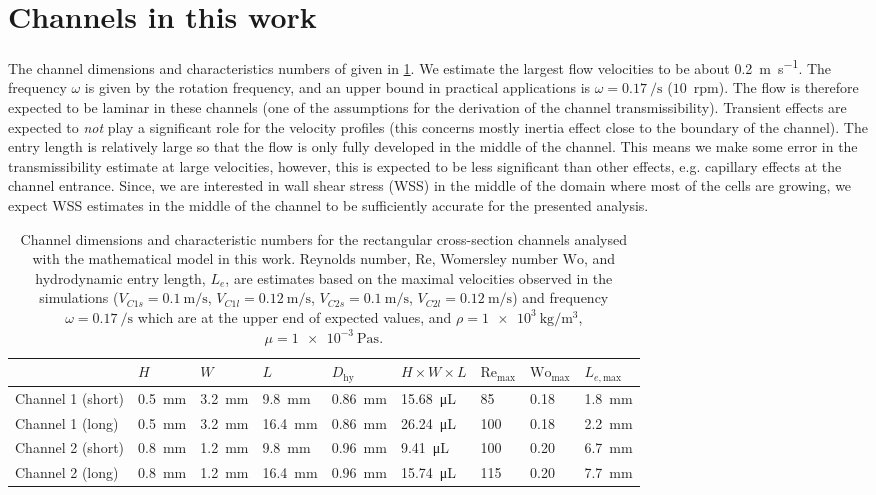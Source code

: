 \documentclass{article}
\begin{document}
\section{Channels in this work}
The channel dimensions and characteristics numbers of given in \cref{tab:val}. We estimate the largest flow velocities to be about \SI{0.2}{\m\per\s}. The frequency $\omega$ is given by the rotation frequency, and an upper bound in practical applications is $\omega = \SI{0.17}{\per\s}$ ($10$~rpm). The flow is therefore expected to be laminar in these channels (one of the assumptions for the derivation of the channel transmissibility). Transient effects are expected to \emph{not} play a significant role for the velocity profiles (this concerns mostly inertia effect close to the boundary of the channel). The entry length is relatively large so that the flow is only fully developed in the middle of the channel. This means we make some error in the transmissibility estimate at large velocities, however, this is expected to be less significant than other effects, e.g. capillary effects at the channel entrance. Since, we are interested in wall shear stress (WSS) in the middle of the domain where most of the cells are growing, we expect WSS estimates in the middle of the channel to be sufficiently accurate for the presented analysis.
\begin{table}[!htb]
\caption{Channel dimensions and characteristic numbers for the rectangular cross-section channels analysed with the mathematical model in this work. Reynolds number, $\text{Re}$, Womersley number $\text{Wo}$, and hydrodynamic entry length, $L_e$, are estimates based on the maximal velocities observed in the simulations ($V_{C1s} = \SI{0.1}{\m\per\s}$, $V_{C1l} = \SI{0.12}{\m\per\s}$, $V_{C2s} = \SI{0.1}{\m\per\s}$, $V_{C2l} = \SI{0.12}{\m\per\s}$) and frequency $\omega = \SI{0.17}{\per\s}$ which are at the upper end of expected values, and $\rho = \SI{1e3}{\kg\per\cubic\m}$, $\mu = \SI{1e-3}{\pascal\s}$.}
\centering
\begin{tabular}{lllllllll}
\toprule
                             & $H$ & $W$ & $L$ & $D_\text{hy}$ & $H\times W\times L$ & $\text{Re}_\text{max}$  & $\text{Wo}_\text{max}$ & $L_{e,\text{max}}$ \\\midrule
    Channel 1 (short) & \SI{0.5}{\milli\m} & \SI{3.2}{\milli\m} & \SI{9.8}{\milli\m}  & \SI{0.86}{\milli\m} & \SI{15.68}{\micro\liter} & 85 & 0.18 & \SI{1.8}{\milli\m} \\
    Channel 1 (long) & \SI{0.5}{\milli\m} & \SI{3.2}{\milli\m} & \SI{16.4}{\milli\m} & \SI{0.86}{\milli\m} & \SI{26.24}{\micro\liter} & 100 & 0.18 & \SI{2.2}{\milli\m}\\\midrule
    Channel 2 (short) & \SI{0.8}{\milli\m} & \SI{1.2}{\milli\m} & \SI{9.8}{\milli\m} & \SI{0.96}{\milli\m} & \SI{9.41}{\micro\liter} & 100 & 0.20 & \SI{6.7}{\milli\m}\\
    Channel 2 (long) & \SI{0.8}{\milli\m} & \SI{1.2}{\milli\m} & \SI{16.4}{\milli\m} & \SI{0.96}{\milli\m} & \SI{15.74}{\micro\liter} & 115 & 0.20 & \SI{7.7}{\milli\m} \\\bottomrule
\end{tabular}
\label{tab:val}
\end{table}
\end{document}
